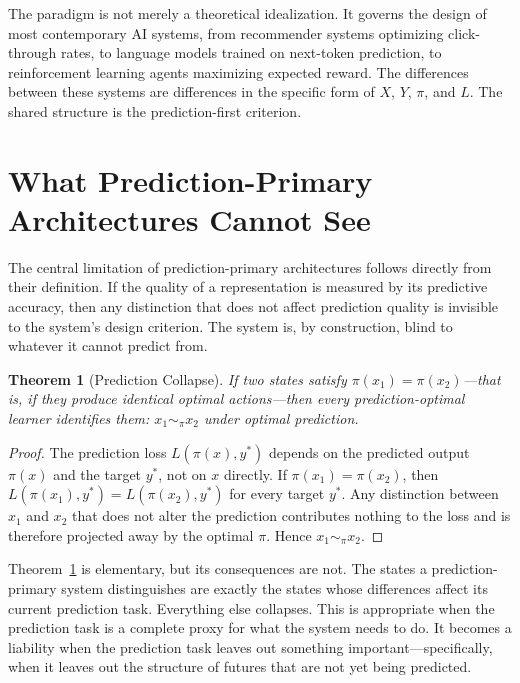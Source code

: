 \documentclass[12pt, oneside]{book}
\theoremstyle{flyxion}
\newtheorem{theorem}{Theorem}[chapter]
\theoremstyle{definition}
\begin{document}
The paradigm is not merely a theoretical idealization. It governs the
design of most contemporary AI systems, from recommender systems
optimizing click-through rates, to language models trained on next-token
prediction, to reinforcement learning agents maximizing expected reward.
The differences between these systems are differences in the specific
form of $X$, $Y$, $\pi$, and $L$. The shared structure is the
prediction-first criterion.

\section{What Prediction-Primary Architectures Cannot See}

The central limitation of prediction-primary architectures follows
directly from their definition. If the quality of a representation is
measured by its predictive accuracy, then any distinction that does not
affect prediction quality is invisible to the system's design criterion.
The system is, by construction, blind to whatever it cannot predict from.

\begin{theorem}[Prediction Collapse]
\label{thm:pred_collapse}
If two states satisfy $\pi(x_1) = \pi(x_2)$---that is, if they produce
identical optimal actions---then every prediction-optimal learner
identifies them: $x_1 \sim_\pi x_2$ under optimal prediction.
\end{theorem}

\begin{proof}
The prediction loss $L(\pi(x), y^*)$ depends on the predicted output
$\pi(x)$ and the target $y^*$, not on $x$ directly. If
$\pi(x_1) = \pi(x_2)$, then $L(\pi(x_1), y^*) = L(\pi(x_2), y^*)$ for
every target $y^*$. Any distinction between $x_1$ and $x_2$ that does
not alter the prediction contributes nothing to the loss and is therefore
projected away by the optimal $\pi$. Hence $x_1 \sim_\pi x_2$.
\end{proof}

Theorem~\ref{thm:pred_collapse} is elementary, but its consequences are
not. The states a prediction-primary system distinguishes are exactly the
states whose differences affect its current prediction task. Everything
else collapses. This is appropriate when the prediction task is a
complete proxy for what the system needs to do. It becomes a liability
when the prediction task leaves out something important---specifically,
when it leaves out the structure of futures that are not yet being
predicted.
\end{document}
